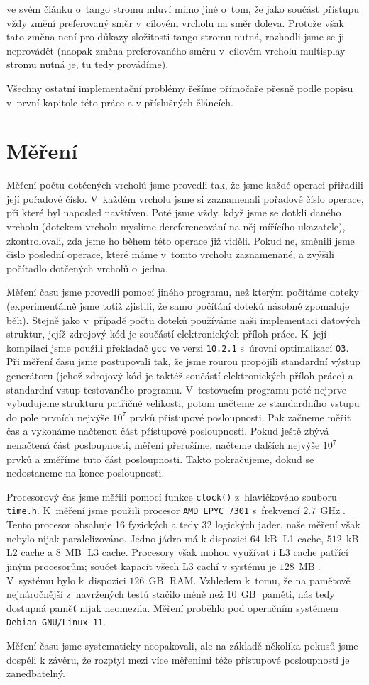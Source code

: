 \citet{tango} ve svém článku o~tango stromu mluví mimo jiné o~tom, že jako
součást přístupu vždy změní preferovaný směr v~cílovém vrcholu na směr doleva.
Protože však tato změna není pro důkazy složitosti tango stromu nutná, rozhodli
jsme se ji neprovádět (naopak změna preferovaného směru v~cílovém vrcholu
multisplay stromu nutná je, tu tedy provádíme).

Všechny ostatní implementační problémy řešíme přímočaře přesně podle popisu
v~první kapitole této práce a v příslušných článcích.

\section{Měření}

Měření počtu dotčených vrcholů jsme provedli tak, že jsme každé operaci 
přiřadili její pořadové číslo. V~každém vrcholu jsme si zaznamenali pořadové číslo
operace, při které byl naposled navštíven. Poté jsme vždy, když jsme se dotkli daného
vrcholu (dotekem vrcholu myslíme dereferencování na něj mířícího ukazatele),
zkontrolovali, zda jsme ho během této operace již viděli. Pokud ne, změnili jsme
číslo poslední operace, které máme v~tomto vrcholu zaznamenané, a zvýšili
počítadlo dotčených vrcholů o~jedna.

Měření času jsme provedli pomocí jiného programu, než kterým počítáme doteky
(experimentálně jsme totiž zjistili, že samo počítání doteků násobně zpomaluje
běh). Stejně jako v~případě počtu doteků používáme naši implementaci datových
struktur, jejíž zdrojový kód je součástí elektronických příloh práce. K~její
kompilaci jsme použili překladač {\tt gcc} ve verzi {\tt 10.2.1} s~úrovní
optimalizací {\tt O3}. Při měření času jsme postupovali tak, že jsme rourou propojili standardní výstup generátoru (jehož zdrojový kód je
taktéž součástí elektronických příloh práce) a standardní vstup testovaného
programu. V~testovacím programu poté nejprve vybudujeme
strukturu patřičné velikosti, potom načteme ze standardního vstupu do pole
prvních nejvýše $10^7$ prvků přístupové posloupnosti. Pak začneme měřit
čas a vykonáme načtenou část přístupové posloupnosti. Pokud ještě zbývá
nenačtená část posloupnosti, měření přerušíme, načteme dalších nejvýše
$10^7$ prvků a změříme tuto část posloupnosti. Takto pokračujeme, dokud
se nedostaneme na konec posloupnosti.

Procesorový čas jsme měřili pomocí funkce {\tt clock()} z~hlavičkového souboru
{\tt time.h}. K~měření jsme použili procesor {\tt AMD EPYC 7301}
s~frekvencí  $2.7\, \operatorname{GHz}$. Tento procesor obsahuje 16 fyzických a tedy
32 logických jader, naše měření však nebylo nijak paralelizováno. Jedno jádro má k dispozici $64\,\operatorname{kB}$ L1 cache, $512\,\operatorname{kB}$ L2 cache a $8\,\operatorname{MB}$ L3 cache. Procesory však mohou využívat i L3 cache patřící jiným procesorům; součet kapacit všech L3 cachí v systému je $128\,\operatorname{MB}$. V~systému bylo
k~dispozici $126\,\operatorname{GB}$ RAM. Vzhledem k~tomu, že na pamětově
nejnáročnější z~navržených testů stačilo méně než $10\,\operatorname{GB}$
paměti, nás tedy dostupná paměť nijak neomezila. Měření proběhlo pod operačním
systémem {\tt Debian GNU/Linux 11}.

Měření času jsme systematicky neopakovali, ale na základě několika pokusů jsme dospěli k závěru, že rozptyl mezi více měřeními téže přístupové posloupnosti je zanedbatelný.
